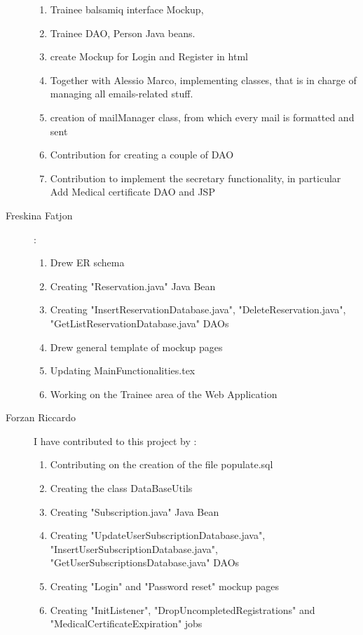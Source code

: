 \begin{description}
\begin{enumerate}
		\item Trainee balsamiq interface Mockup,
		\item Trainee DAO, Person Java beans.
		\item create Mockup for Login and Register in html
		\item Together with Alessio Marco, implementing classes, that is in charge of managing all emails-related stuff.
		\item creation of mailManager class, from which every mail is formatted and sent
	    \item Contribution for creating a couple of DAO
	    \item Contribution to implement the secretary functionality, in particular Add Medical certificate DAO and JSP
	\end{enumerate}
	\item[Freskina Fatjon] :
	\begin{enumerate}
		\item Drew ER schema 
		\item Creating "Reservation.java" Java Bean 
		\item Creating "InsertReservationDatabase.java", "DeleteReservation.java", "GetListReservationDatabase.java" DAOs
		\item Drew general template of mockup pages 
		\item Updating MainFunctionalities.tex
		\item Working on the Trainee area of the Web Application
	\end{enumerate} 
	
	\item[Forzan Riccardo] I have contributed to this project by :
	\begin{enumerate}
		\item Contributing on the creation of the file populate.sql
		\item Creating the class DataBaseUtils
		\item Creating "Subscription.java" Java Bean
		\item Creating "UpdateUserSubscriptionDatabase.java", "InsertUserSubscriptionDatabase.java", "GetUserSubscriptionsDatabase.java" DAOs
		\item Creating "Login" and "Password reset" mockup pages
		\item Creating "InitListener", "DropUncompletedRegistrations" and "MedicalCertificateExpiration" jobs
	\end{enumerate}
	

\end{description}

